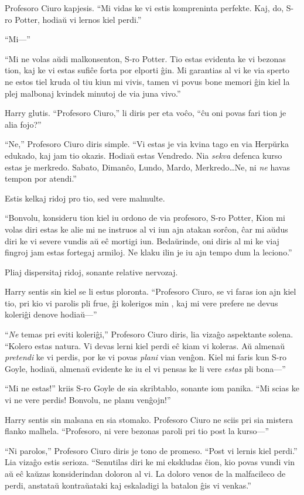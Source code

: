 Profesoro Ciuro kapjesis. ``Mi vidas ke vi estis kompreninta
perfekte. Kaj, do, S-ro Potter, hodiaŭ vi lernos kiel perdi.''

``Mi—''

``Mi ne volas aŭdi malkonsenton, S-ro Potter. Tio estas evidenta ke vi
bezonas tion, kaj ke vi estas sufiĉe forta por elporti ĝin. Mi
garantias al vi ke via sperto ne estos tiel kruda ol tiu kiun mi
vivis, tamen vi povus bone memori ĝin kiel la plej malbonaj kvindek
minutoj de via juna vivo.''

Harry glutis. ``Profesoro Ciuro,'' li diris per eta voĉo, ``ĉu oni
povas fari tion je alia fojo?''

``Ne,'' Profesoro Ciuro diris simple. ``Vi estas je via kvina tago en
via Herpŭrka edukado, kaj jam tio okazis. Hodiaŭ estas Vendredo. Nia
\emph{sekva} defenca kurso estas je merkredo. Sabato, Dimanĉo, Lundo,
Mardo, Merkredo\ldots Ne, ni \emph{ne} havas tempon por atendi.''

Estis kelkaj ridoj pro tio, sed vere malmulte.

``Bonvolu, konsideru tion kiel iu ordono de via profesoro, S-ro
Potter, Kion mi volas diri estas ke alie mi ne instruos al vi iun ajn
atakan sorĉon, ĉar mi aŭdus diri ke vi severe vundis aŭ eĉ mortigi
iun. Bedaŭrinde, oni diris al mi ke viaj fingroj jam estas fortegaj
armiloj. Ne klaku ilin je iu ajn tempo dum la leciono.''

Pliaj dispersitaj ridoj, sonante relative nervozaj.

Harry sentis sin kiel se li estus ploronta. ``Profesoro Ciuro, se vi
faras ion ajn kiel tio, pri kio vi parolis pli frue, ĝi kolerigos min
, kaj mi vere prefere ne devus koleriĝi denove hodiaŭ—''

``\emph{Ne} temas pri eviti koleriĝi,'' Profesoro Ciuro diris, lia
vizaĝo aspektante solena. ``Kolero estas natura. Vi devas lerni kiel
perdi eĉ kiam vi koleras. Aŭ almenaŭ \emph{pretendi} ke vi perdis, por
ke vi povas \emph{plani} vian venĝon. Kiel mi faris kun S-ro Goyle,
hodiaŭ, almenaŭ evidente ke iu el vi pensas ke li vere \emph{estas}
pli bona—''

``Mi ne estas!'' kriis S-ro Goyle de sia skribtablo, sonante iom
panika. ``Mi scias ke vi ne vere perdis! Bonvolu, ne planu venĝojn!''

Harry sentis sin malsana en sia stomako. Profesoro Ciuro ne sciis pri
sia mistera flanko malhela. ``Profesoro, ni vere bezonas paroli pri
tio post la kurso—'' 

``Ni parolos,'' Profesoro Ciuro diris je tono de promeso. ``Post vi
lernis kiel perdi.'' Lia vizaĝo estis serioza. ``Senutilas diri ke mi
ekskludas ĉion, kio povas vundi vin aŭ eĉ kaŭzas konsiderindan doloron al
vi. La doloro venos de la malfacileco de perdi, anstataŭ kontraŭataki
kaj eskaladigi la batalon ĝis vi venkas.''

